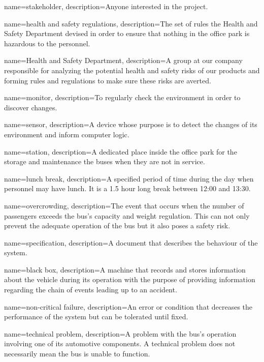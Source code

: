 {%
	name={stakeholder},
	description={Anyone interested in the project.}
}

{%
	name={health and safety regulations},
	description={The set of rules the Health and Safety Department devised in order to ensure that nothing in the office park is hazardous to the personnel.}
}

{%
	name={Health and Safety Department},
	description={A group at our company responsible for analyzing the potential health and safety risks of our products and forming rules and regulations to make sure these risks are averted.}
}

{%
	name={monitor},
	description={To regularly check the environment in order to discover changes.}
}

{%
	name={sensor},
	description={A device whose purpose is to detect the changes of its environment and inform computer logic.}
}

{%
	name={station},
	description={A dedicated place inside the office park for the storage and maintenance the buses when they are not in service.}
}

{%
	name={lunch break},
	description={A specified period of time during the day when personnel may have lunch. It is a 1.5 hour long break between 12:00 and 13:30.}
}

{%
	name={overcrowding},
	description={The event that occurs when the number of passengers exceeds the bus's capacity and weight regulation. This can not only prevent the adequate operation of the bus but it also poses a safety risk.}
}

{%
	name={specification},
	description={A document that describes the behaviour of the system.}
}

{%
	name={black box},
	description={A machine that records and stores information about the vehicle during its operation with the purpose of providing information regarding the chain of events leading up to an accident.}
}

{%
	name={non-critical failure},
	description={An error or condition that decreases the performance of the system but can be tolerated until fixed.}
}

{%
	name={technical problem},
	description={A problem with the bus’s operation involving one of its automotive components. A technical problem does not necessarily mean the bus is unable to function.}
}

